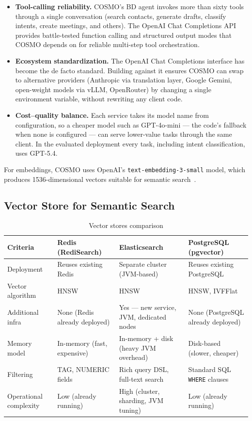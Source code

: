\documentclass[a4paper]{article}
\begin{document}
\begin{itemize}
  \item \textbf{Tool-calling reliability.} COSMO's BD agent
  invokes more than sixty tools through a single conversation
  (search contacts, generate drafts, classify intents, create
  meetings, and others). The OpenAI Chat Completions API provides
  battle-tested function calling and structured output modes that
  COSMO depends on for reliable multi-step tool orchestration.

  \item \textbf{Ecosystem standardization.} The OpenAI Chat
  Completions interface has become the de facto standard.
  Building against it ensures COSMO can swap to alternative
  providers (Anthropic via translation layer, Google Gemini,
  open-weight models via vLLM, OpenRouter) by changing a single
  environment variable, without rewriting any client code.

  \item \textbf{Cost--quality balance.} Each service takes its
  model name from configuration, so a cheaper model such as
  GPT-4o-mini --- the code's fallback when none is configured --- can
  serve lower-value tasks through the same client. In the evaluated
  deployment every task, including intent classification, uses
  GPT-5.4.
\end{itemize}

For embeddings, COSMO uses OpenAI's
\texttt{text-embedding-3-small} model, which produces
1536-dimensional vectors suitable for semantic
search~\cite{openai_embeddings}.

\subsection{Vector Store for Semantic Search}
\label{appendix:tech-vector}

\begin{table}[H]
\centering
\caption{Vector stores comparison}
\label{tab:vector-store-comparison}
\begin{tabular}{l p{3.5cm} p{3.5cm} p{3.5cm}}
\hline
\textbf{Criteria} & \textbf{Redis (RediSearch)} & \textbf{Elasticsearch} & \textbf{PostgreSQL (pgvector)} \\
\hline
Deployment & Reuses existing Redis & Separate cluster (JVM-based) & Reuses existing PostgreSQL \\
Vector algorithm & HNSW & HNSW & HNSW, IVFFlat \\
Additional infra & None (Redis already deployed) & Yes --- new service, JVM, dedicated nodes & None (PostgreSQL already deployed) \\
Memory model & In-memory (fast, expensive) & In-memory + disk (heavy JVM overhead) & Disk-based (slower, cheaper) \\
Filtering & TAG, NUMERIC fields & Rich query DSL, full-text search & Standard SQL \texttt{WHERE} clauses \\
Operational complexity & Low (already running) & High (cluster, sharding, JVM tuning) & Low (already running) \\
\hline
\end{tabular}
\end{table}
\end{document}
